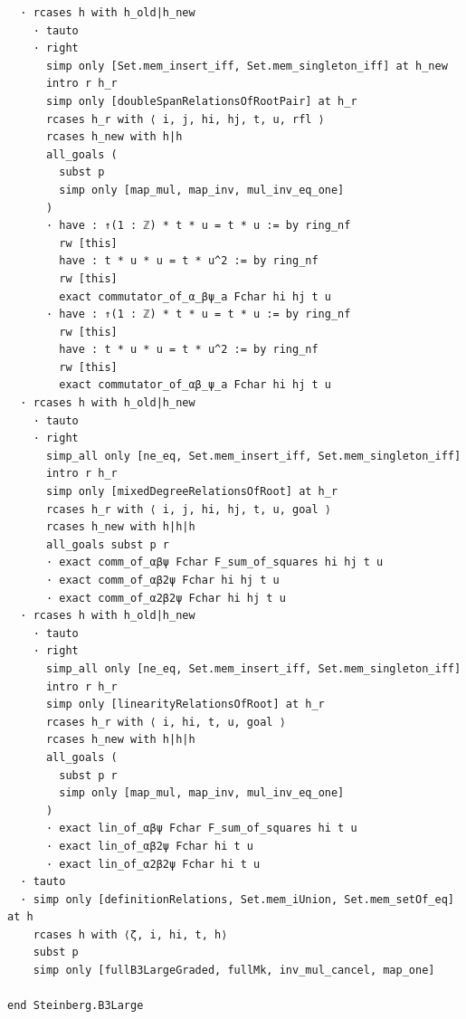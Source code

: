 \begin{Verbatim}
  · rcases h with h_old|h_new
    · tauto
    · right
      simp only [Set.mem_insert_iff, Set.mem_singleton_iff] at h_new
      intro r h_r
      simp only [doubleSpanRelationsOfRootPair] at h_r
      rcases h_r with ⟨ i, j, hi, hj, t, u, rfl ⟩
      rcases h_new with h|h
      all_goals (
        subst p
        simp only [map_mul, map_inv, mul_inv_eq_one]
      )
      · have : ↑(1 : ℤ) * t * u = t * u := by ring_nf
        rw [this]
        have : t * u * u = t * u^2 := by ring_nf
        rw [this]
        exact commutator_of_α_βψ_a Fchar hi hj t u
      · have : ↑(1 : ℤ) * t * u = t * u := by ring_nf
        rw [this]
        have : t * u * u = t * u^2 := by ring_nf
        rw [this]
        exact commutator_of_αβ_ψ_a Fchar hi hj t u
  · rcases h with h_old|h_new
    · tauto
    · right
      simp_all only [ne_eq, Set.mem_insert_iff, Set.mem_singleton_iff]
      intro r h_r
      simp only [mixedDegreeRelationsOfRoot] at h_r
      rcases h_r with ⟨ i, j, hi, hj, t, u, goal ⟩
      rcases h_new with h|h|h
      all_goals subst p r
      · exact comm_of_αβψ Fchar F_sum_of_squares hi hj t u
      · exact comm_of_αβ2ψ Fchar hi hj t u
      · exact comm_of_α2β2ψ Fchar hi hj t u
  · rcases h with h_old|h_new
    · tauto
    · right
      simp_all only [ne_eq, Set.mem_insert_iff, Set.mem_singleton_iff]
      intro r h_r
      simp only [linearityRelationsOfRoot] at h_r
      rcases h_r with ⟨ i, hi, t, u, goal ⟩
      rcases h_new with h|h|h
      all_goals (
        subst p r
        simp only [map_mul, map_inv, mul_inv_eq_one]
      )
      · exact lin_of_αβψ Fchar F_sum_of_squares hi t u
      · exact lin_of_αβ2ψ Fchar hi t u
      · exact lin_of_α2β2ψ Fchar hi t u
  · tauto
  · simp only [definitionRelations, Set.mem_iUnion, Set.mem_setOf_eq] at h
    rcases h with ⟨ζ, i, hi, t, h⟩
    subst p
    simp only [fullB3LargeGraded, fullMk, inv_mul_cancel, map_one]

end Steinberg.B3Large
\end{Verbatim}
